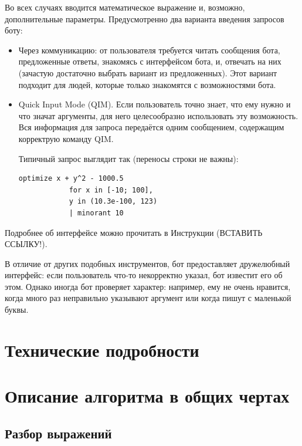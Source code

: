 \documentclass[11pt]{article}
\begin{document}
    Во всех случаях вводится математическое выражение и, возможно, дополнительные параметры.
    Предусмотренно два варианта введения запросов боту:
    \begin{itemize}
        \item Через коммуникацию: от пользователя требуется читать сообщения бота, предложенные ответы, знакомясь с интерфейсом бота,
              и, отвечать на них (зачастую достаточно выбрать вариант из предложенных).
              Этот вариант подходит для людей, которые только знакомятся с возможностями бота.
        \item Quick Input Mode (QIM).
              Если пользователь точно знает, что ему нужно и что значат аргументы, для него целесообразно использовать эту возможность.
              Вся информация для запроса передаётся одним сообщением, содержащим корректрую команду QIM.

        Типичный запрос выглядит так (переносы строки не важны): \newline

        \begin{lstlisting}[label={lst:QIM-example}]
            optimize x + y^2 - 1000.5
            for x in [-10; 100],
            y in (10.3e-100, 123)
            | minorant 10
        \end{lstlisting}

    \end{itemize}

    Подробнее об интерфейсе можно прочитать в Инструкции (ВСТАВИТЬ ССЫЛКУ!).


    В отличие от других подобных инструментов, бот предоставляет дружелюбный интерфейс: если пользователь что-то некорректно указал,
    бот известит его об этом.
    Однако иногда бот проверяет характер: например, ему не очень нравится, когда много раз неправильно указывают аргумент или
    когда пишут с маленькой буквы.

    \section{Технические подробности}


    \section{Описание алгоритма в общих чертах}

    \subsection{Разбор выражений}
\end{document}
